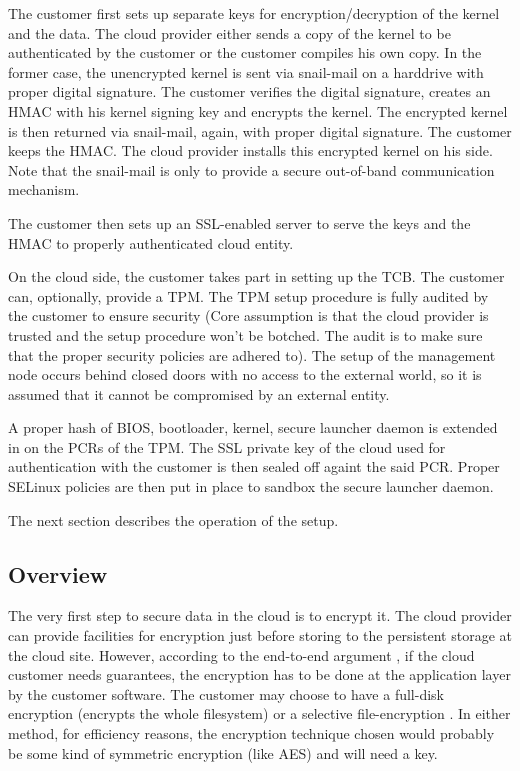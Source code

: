 \documentclass[10pt,twocolumn,pdftex]{article}
\begin{document}
The customer first sets up separate keys for encryption/decryption of the kernel and the data. The cloud provider either sends a copy of the kernel to be authenticated by the customer or the customer compiles his own copy. In the former case, the unencrypted kernel is sent via snail-mail on a harddrive with proper digital signature. The customer verifies the digital signature, creates an HMAC with his kernel signing key and encrypts the kernel. The encrypted kernel is then returned via snail-mail, again, with proper digital signature. The customer keeps the HMAC. The cloud provider installs this encrypted kernel on his side. Note that the snail-mail is only to provide a secure out-of-band communication mechanism.

The customer then sets up an SSL-enabled server to serve the keys and the HMAC to properly authenticated cloud entity. 

On the cloud side, the customer takes part in setting up the TCB. The customer can, optionally, provide a TPM. The TPM setup procedure is fully audited by the customer to ensure security (Core assumption is that the cloud provider is trusted and the setup procedure won't be botched. The audit is to make sure that the proper security policies are adhered to). The setup of the management node occurs behind closed doors with no access to the external world, so it is assumed that it cannot be compromised by an external entity.

A proper hash of {BIOS, bootloader, kernel, secure launcher daemon} is extended in on the PCRs of the TPM. The SSL private key of the cloud used for authentication with the customer is then sealed off againt the said PCR. Proper SELinux policies are then put in place to sandbox the secure launcher daemon.

The next section describes the operation of the setup.

\subsection{Overview}
The very first step to secure data in the cloud is to encrypt it. The cloud provider can provide facilities for encryption just before storing to the persistent storage at the cloud site. However, according to the end-to-end argument \cite{end-to-end}, if the cloud customer needs guarantees, the encryption has to be done at the application layer by the customer software. The customer may choose to have a full-disk encryption (encrypts the whole filesystem) \cite{disk-encryption, truecrypt} or a selective file-encryption \cite{nss}. In either method, for efficiency reasons, the encryption technique chosen would probably be some kind of symmetric encryption (like AES) and will need a key. 
\end{document}
